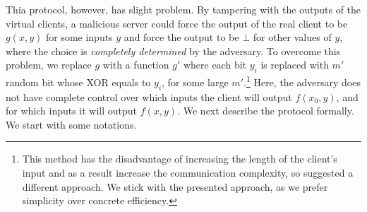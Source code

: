\documentclass{llncs}
\newcommand{\OTfunc}{\mathcal{OT}}
\newcommand{\OThybrid}{\OTfunc\mbox{-}\text{hybrid}}
\newcommand{\X}{\mathcal{X}}
\newcommand{\Y}{\mathcal{Y}}
\renewcommand{\Z}{\set{0,\ldots,k-1}}
\renewcommand{\b}{\myvec{b}}
\renewcommand{\a}{\myvec{a}}
\newcommand{\srvr}{\alpha}
\newcommand{\clnt}{\beta}
\newcommand{\local}{\varphi}
\renewcommand{\Sc}{\mathsf{S}}
\newcommand{\Cc}{\mathsf{C}}
\begin{document}
Thia protocol, however, has slight problem. By tampering with the outputs of the virtual clients, a malicious server could force the output of the real client to be $g(x,y)$ for some inputs $y$ and force the output to be $\bot$ for other values of $y$, where the choice is \emph{completely determined} by the adversary. To overcome this problem, we replace $g$ with a function $g'$ where each bit $y_i$ is replaced with $m'$ random bit whose XOR equals to $y_i$, for some large $m'$.\footnote{This method has the disadvantage of increasing the length of the client's input and as a result increase the communication complexity, so \cite{IKOPS11} suggested a different approach. We stick with the presented approach, as we prefer simplicity over concrete efficiency.} Here, the adversary does not have complete control over which inputs the client will output $f(x_0,y)$, and for which inputs it will output $f(x,y)$.
We next describe the protocol formally. We start with some notations.

\end{document}
